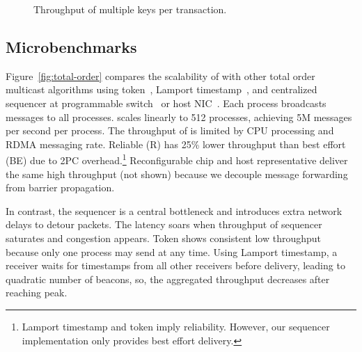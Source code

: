 \begin{figure}[t!]
\begin{minipage}{.31\textwidth}
		\centering
		\caption{Throughput of multiple keys per transaction.}
		\label{fig:multishard}
    \end{minipage}
	\hspace{0.01\textwidth}
\vspace{-15pt}
\end{figure}
\fi

\subsection{Microbenchmarks}

Figure~\ref{fig:total-order} compares the scalability of \sys{} with other total order multicast algorithms using token~\cite{rajagopalan1989token}, Lamport timestamp~\cite{lamport1978time}, and centralized sequencer at programmable switch~\cite{eris} or host NIC~\cite{kaminsky2016design}.
Each process broadcasts messages to all processes.
\sys{} scales linearly to 512 processes, achieving 5M messages per second per process.
The throughput of \sys is limited by CPU processing and RDMA messaging rate.
Reliable (R) \sys{} has 25\% lower throughput than best effort (BE) \sys{} due to 2PC overhead.\footnote{Lamport timestamp and token imply reliability. However, our sequencer implementation only provides best effort delivery.}
Reconfigurable chip and host representative deliver the same high throughput (not shown) because we decouple message forwarding from barrier propagation.

In contrast, the sequencer is a central bottleneck and introduces extra network delays to detour packets.
The latency soars when throughput of sequencer saturates and congestion appears.
Token shows consistent low throughput because only one process may send at any time.
Using Lamport timestamp, a receiver waits for timestamps from all other receivers before delivery, leading to quadratic number of beacons, so, the aggregated throughput decreases after reaching peak.





